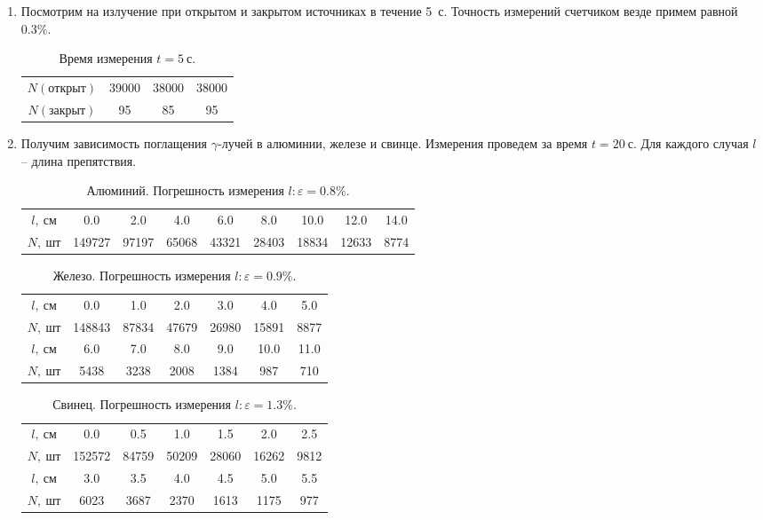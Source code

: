 \documentclass{lab}
\begin{document}
\begin{enumerate}
\item
Посмотрим на излучение при открытом и закрытом источниках в течение 5~с. Точность измерений 
счетчиком везде примем равной $ 0.3\% $.
\begin{table}[H]
	\centering
	\begin{tabular}{|c|ccc|}
		\hline
		$ N(открыт) $ & 39000 & 38000 & 38000 \\
		$ N(закрыт) $ & 95    & 85    & 95    \\ \hline
	\end{tabular}
	\caption{Время измерения $ t=5~с $.}
	\label{tab0}
\end{table}

	
\item 
Получим зависимость поглащения $ \gamma $-лучей в алюминии, железе и свинце. Измерения 
проведем за время $ t = 20~с $. Для каждого случая $ l $ -- длина препятствия.

\begin{table}[H]
	\centering
	\begin{tabular}{|c|cccccccc|}
		\hline
		$ l,~см $ & 0.0    & 2.0   & 4.0   & 6.0   & 8.0   & 10.0  & 12.0  & 14.0 \\
		$ N,~шт $ & 149727 & 97197 & 65068 & 43321 & 28403 & 18834 & 12633 & 8774 \\ \hline
	\end{tabular}
	\caption{Алюминий. Погрешность измерения $ l: \varepsilon = 0.8\% $.}
	\label{tab1}
\end{table}

\begin{table}[H]
	\centering
	\begin{tabular}{|c|cccccc|}
		\hline
		$ l,~см $ & 0.0    & 1.0   & 2.0   & 3.0   & 4.0   & 5.0  \\
		$ N,~шт $ & 148843 & 87834 & 47679 & 26980 & 15891 & 8877 \\ \hline
		$ l,~см $ & 6.0  & 7.0  & 8.0  & 9.0  & 10.0 & 11.0 \\
		$ N,~шт $ & 5438 & 3238 & 2008 & 1384 & 987  & 710  \\ \hline
	\end{tabular}
	\caption{Железо. Погрешность измерения $ l: \varepsilon = 0.9\% $.}
	\label{tab2}
\end{table}

\begin{table}[H]
	\centering
	\begin{tabular}{|c|cccccc|}
		\hline
		$ l,~см $ & 0.0    & 0.5   & 1.0   & 1.5   & 2.0   & 2.5  \\
		$ N,~шт $ & 152572 & 84759 & 50209 & 28060 & 16262 & 9812 \\ \hline
		$ l,~см $ & 3.0  & 3.5  & 4.0  & 4.5  & 5.0  & 5.5 \\
		$ N,~шт $ & 6023 & 3687 & 2370 & 1613 & 1175 & 977 \\ \hline
	\end{tabular}
	\caption{Свинец. Погрешность измерения $ l: \varepsilon = 1.3\% $.}
	\label{tab3}
\end{table}


\end{enumerate}
\end{document}
